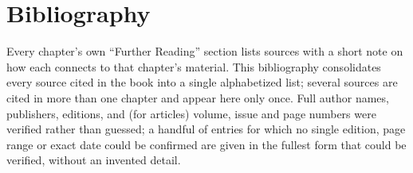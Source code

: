 \documentclass[openany]{book}
\begin{document}
\chapter*{Bibliography}

Every chapter's own ``Further Reading'' section lists sources with a short note on how each connects to that chapter's material. This bibliography consolidates every source cited in the book into a single alphabetized list; several sources are cited in more than one chapter and appear here only once. Full author names, publishers, editions, and (for articles) volume, issue and page numbers were verified rather than guessed; a handful of entries for which no single edition, page range or exact date could be confirmed are given in the fullest form that could be verified, without an invented detail.

\printbibliography[heading=none]

\clearpage
\cleardoublepage{}
{}

\printindex
\end{document}
